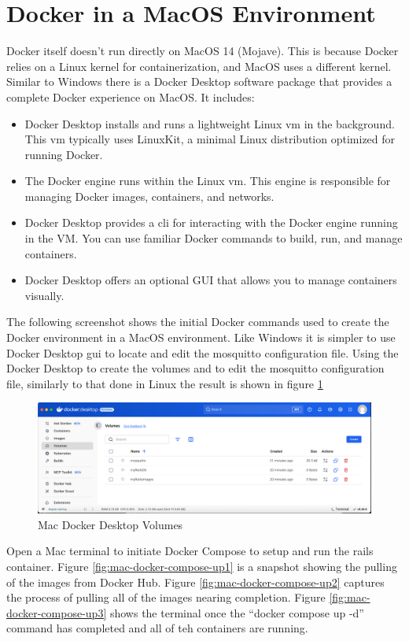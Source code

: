 \section{Docker in a MacOS Environment}
\label{sec:mac-cmds}
Docker itself doesn't run directly on MacOS 14 (Mojave). This is because Docker relies on a Linux kernel for containerization, and MacOS uses a different kernel. 
Similar to Windows there is a Docker Desktop software package that provides a complete Docker experience on MacOS. It includes:
\begin{itemize}
\item Docker Desktop installs and runs a lightweight Linux \gls{vm} in the background. This \gls{vm} typically uses LinuxKit, a minimal Linux distribution optimized for running Docker.
\item The Docker engine runs within the Linux \gls{vm}. This engine is responsible for managing Docker images, containers, and networks.
\item Docker Desktop provides a \gls{cli} for interacting with the Docker engine running in the VM. You can use familiar Docker commands to build, run, and manage containers.
\item Docker Desktop offers an optional GUI that allows you to manage containers visually.
\end{itemize}
The following screenshot shows the initial Docker commands used to create the Docker environment in a MacOS environment. Like Windows it is simpler to use Docker Desktop \gls{gui} to locate and edit the mosquitto configuration file.
Using the Docker Desktop to create the volumes and to edit the mosquitto configuration file, similarly to that done in Linux the result is shown in figure \ref{fig:mac-docker-volumes}
\begin{figure}[H]
    \centering
    \includegraphics[scale=0.33]{../Images/volumes-mac.png}
    \caption{Mac Docker Desktop Volumes}
    \label{fig:mac-docker-volumes}
\end{figure}
Open a Mac terminal to initiate Docker Compose to setup and run the \gls{rails} container. Figure \ref{fig:mac-docker-compose-up1} is a snapshot showing the pulling of the images from Docker Hub. Figure \ref{fig:mac-docker-compose-up2} captures the process of pulling all of the images nearing completion. Figure \ref{fig:mac-docker-compose-up3} shows the terminal once the ``docker compose up -d'' command has completed and all of teh containers are running.

